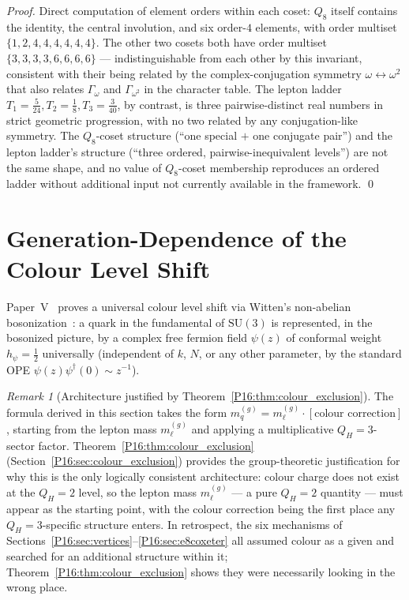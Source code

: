 \documentclass[11pt,a4paper]{article}
\theoremstyle{definition}\newtheorem{definition}[theorem]{Definition}
\theoremstyle{remark}
\newtheorem{remark}[theorem]{Remark}
\theoremstyle{definition}\newtheorem{construction}[theorem]{Construction}
\newcommand{\SU}{\mathrm{SU}}
\newcommand{\QH}{Q_H}
\begin{document}
\begin{proof}
Direct computation of element orders within each coset: $Q_8$ itself
contains the identity, the central involution, and six order-$4$
elements, with order multiset $\{1,2,4,4,4,4,4,4\}$. The other two
cosets both have order multiset $\{3,3,3,3,6,6,6,6\}$ ---
indistinguishable from each other by this invariant, consistent with
their being related by the complex-conjugation symmetry
$\omega\leftrightarrow\omega^2$ that also relates $\Gamma_\omega$ and
$\Gamma_{\omega^2}$ in the character table. The lepton ladder
$T_1=\tfrac{5}{24},T_2=\tfrac18,T_3=\tfrac{3}{40}$, by contrast, is
three pairwise-distinct real numbers in strict geometric progression,
with no two related by any conjugation-like symmetry. The $Q_8$-coset
structure (``one special $+$ one conjugate pair'') and the lepton
ladder's structure (``three ordered, pairwise-inequivalent levels'')
are not the same shape, and no value of $Q_8$-coset membership
reproduces an ordered ladder without additional input not currently
available in the framework.
\qed
\end{proof}

\section{Generation-Dependence of the Colour Level Shift}
\label{P16:sec:colourshift}

Paper~V~\cite{Paper5} proves a universal colour level shift via
Witten's non-abelian bosonization~\cite{Witten1984}: a quark in the
fundamental of $\SU(3)$ is represented, in the bosonized picture, by a
complex free fermion field $\psi(z)$ of conformal weight
$h_\psi=\tfrac12$ universally (independent of $k$, $N$, or any other
parameter, by the standard OPE $\psi(z)\psi^\dagger(0)\sim z^{-1}$).

\begin{remark}[Architecture justified by Theorem~\ref{P16:thm:colour_exclusion}]
\label{P16:rem:architecture_justified}
The formula derived in this section takes the form
$m_q^{(g)} = m_\ell^{(g)} \cdot [\text{colour correction}]$, starting
from the lepton mass $m_\ell^{(g)}$ and applying a multiplicative
$\QH=3$-sector factor.  Theorem~\ref{P16:thm:colour_exclusion}
(Section~\ref{P16:sec:colour_exclusion}) provides the group-theoretic
justification for why this is the only logically consistent
architecture: colour charge does not exist at the $\QH=2$ level, so
the lepton mass $m_\ell^{(g)}$ --- a pure $\QH=2$ quantity --- must
appear as the starting point, with the colour correction being the
first place any $\QH=3$-specific structure enters.  In retrospect,
the six mechanisms of Sections~\ref{P16:sec:vertices}--\ref{P16:sec:e8coxeter}
all assumed colour as a given and searched for an additional structure
within it; Theorem~\ref{P16:thm:colour_exclusion} shows they were
necessarily looking in the wrong place.
\end{remark}
\end{document}
